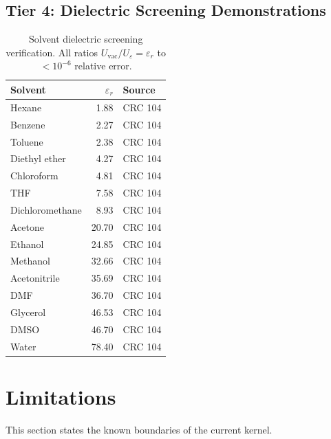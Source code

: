 \documentclass[11pt,twoside]{article}
\begin{document}
\subsection{Tier 4: Dielectric Screening Demonstrations}

\begin{table}[H]
\centering
\caption{Solvent dielectric screening verification.  All ratios
$U_{\mathrm{vac}} / U_\varepsilon = \varepsilon_r$ to $< 10^{-6}$ relative error.}
\label{tab:solvents}
\begin{tabular}{lrl}
\toprule
\textbf{Solvent} & $\varepsilon_r$ & \textbf{Source} \\
\midrule
Hexane          & 1.88  & CRC 104 \\
Benzene         & 2.27  & CRC 104 \\
Toluene         & 2.38  & CRC 104 \\
Diethyl ether   & 4.27  & CRC 104 \\
Chloroform      & 4.81  & CRC 104 \\
THF             & 7.58  & CRC 104 \\
Dichloromethane & 8.93  & CRC 104 \\
Acetone         & 20.70 & CRC 104 \\
Ethanol         & 24.85 & CRC 104 \\
Methanol        & 32.66 & CRC 104 \\
Acetonitrile    & 35.69 & CRC 104 \\
DMF             & 36.70 & CRC 104 \\
Glycerol        & 46.53 & CRC 104 \\
DMSO            & 46.70 & CRC 104 \\
Water           & 78.40 & CRC 104 \\
\bottomrule
\end{tabular}
\end{table}


\section{Limitations}
\label{sec:limitations}

This section states the known boundaries of the current kernel.
\end{document}

